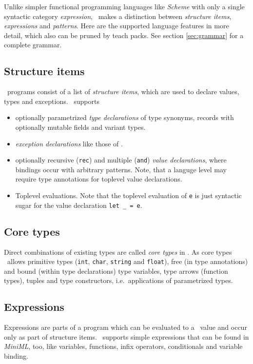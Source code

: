 Unlike simpler functional programming languages like \textit{Scheme} with only
a single syntactic category \emph{expression}, \ocaml\ makes a distinction
between \emph{structure items}, \emph{expressions} and \emph{patterns}.  Here
are the supported language features in more detail, which also can be pruned by
teach packs. See section \ref{sec:grammar} for a complete grammar.


\subsection*{Structure items}

\ocaml\ programs consist of a list of \emph{structure items}, which are used to
declare values, types and exceptions.
\easyocaml\ supports
\begin{itemize}
  \item optionally parametrized \emph{type declarations} of type synonyms,
    records with optionally mutable fields and variant types.
  \item \emph{exception declarations} like those of \ocaml.
  \item optionally recursive (\texttt{rec}) and multiple (\texttt{and})
    \emph{value declarations}, where bindings occur with arbitrary patterns.
    Note, that a languge level may require type annotations for toplevel value
    declarations.
  \item Toplevel evaluations. Note that the toplevel evaluation of \texttt{e} is just
    syntactic sugar for the value declaration \texttt{let \_ = e}.
\end{itemize}

\subsection*{Core types}
Direct combinations of existing types are called \emph{core types} in \ocaml.
As core types \easyocaml\ allows primitive types (\texttt{int}, \texttt{char},
\texttt{string} and \texttt{float}), free (in type annotations) and bound
(within type declarations) type variables, type arrows (function types), tuples
and type constructors, i.e.\ applications of parametrized types.

\subsection*{Expressions}

Expressions are parts of a program which can be evaluated to a \ocaml\ value and
occur only as part of structure items.
\easyocaml\ supports simple expressions that can be found in \textsl{MiniML},
too, like variables, functions, infix operators, conditionals and variable
binding.

